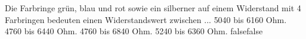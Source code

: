     {Die Farbringe grün, blau und rot sowie ein silberner auf einem Widerstand mit 4 Farbringen bedeuten einen Widerstandswert zwischen ...}
    {5040 bis 6160 Ohm.}
    {4760 bis 6440 Ohm.}
    {4760 bis 6840 Ohm.}
    {5240 bis 6360 Ohm.}
    {false}{false}